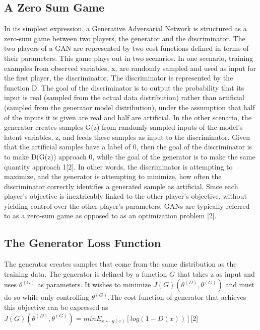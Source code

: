 \documentclass[conference]{IEEEtran}
\begin{document}
\subsection{A Zero Sum Game}
In its simplest expression, a Generative Adversarial Network is structured as a zero-sum game between two players, the generator and the discriminator. The two players of a GAN are represented by two cost functions defined in terms of their parameters. This game plays out in two scenarios. In one scenario, training examples from observed variables, x, are randomly sampled and used as input for the first player, the discriminator. The discriminator is represented by the function D. The goal of the discriminator is to output the probability that its input is real (sampled from the actual data distribution) rather than artificial (sampled from the generator model distribution), under the assumption that half of the inputs it is given are real and half are artificial. In the other scenario, the generator creates samples G(z) from randomly sampled inputs of the model's latent variables, z, and feeds these samples as input to the discriminator.
\newlabel \indent Given that the artificial samples have a label of 0, then the goal of the discriminator is to make D(G(z)) approach 0,  while the goal of the generator is to make the same quantity approach 1[2]. In other words, the discriminator is attempting to maximize, and the generator is attempting to minimize, how often the discriminator correctly identifies a generated sample as artificial. Since each player's objective is inextricably linked to the other player's objective, without yielding control over the other player's parameters, GANs are typically referred to as a zero-sum game as opposed to as an optimization problem [2].

\subsection{The Generator Loss Function}
\indent The generator creates samples that come from the same distribution as the training data. The generator is defined by a function $G$ that takes z as input and uses $\theta^{(G)}$ as parameters. It wishes to minimize $J(G) (\theta^{(D)}, \theta^{(G)})$ and must do so while only controlling $\theta^{(G)}.$The cost function of generator that achieves this objective can be expressed as \newline\newline
$J(G) (\theta^{(D)}, \theta^{(G)}) = min E_{x \leftarrow g(z)} [ log(1-D(x))]$[2]
\end{document}
